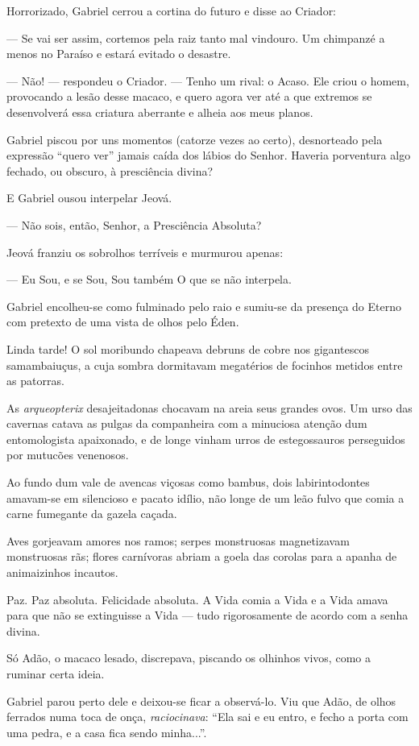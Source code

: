 Horrorizado, Gabriel cerrou a cortina do futuro e disse ao Criador:

--- Se vai ser assim, cortemos pela raiz tanto mal vindouro. Um
chimpanzé a menos no Paraíso e estará evitado o desastre.

--- Não! --- respondeu o Criador. --- Tenho um rival: o Acaso. Ele criou
o homem, provocando a lesão desse macaco, e quero agora ver até a que
extremos se desenvolverá essa criatura aberrante e alheia aos meus
planos.

Gabriel piscou por uns momentos (catorze vezes ao certo), desnorteado
pela expressão ``quero ver'' jamais caída dos lábios do Senhor. Haveria
porventura algo fechado, ou obscuro, à presciência divina?

E Gabriel ousou interpelar Jeová.

--- Não sois, então, Senhor, a Presciência Absoluta?

Jeová franziu os sobrolhos terríveis e murmurou apenas:

--- Eu Sou, e se Sou, Sou também O que se não interpela.

Gabriel encolheu-se como fulminado pelo raio e sumiu-se da presença do
Eterno com pretexto de uma vista de olhos pelo Éden.

Linda tarde! O sol moribundo chapeava debruns de cobre nos gigantescos
samambaiuçus, a cuja sombra dormitavam megatérios de focinhos metidos
entre as patorras.

As \emph{arqueopterix} desajeitadonas chocavam na areia seus grandes
ovos. Um urso das cavernas catava as pulgas da companheira com a
minuciosa atenção dum entomologista apaixonado, e de longe vinham urros
de estegossauros perseguidos por mutucões venenosos.

Ao fundo dum vale de avencas viçosas como bambus, dois labirintodontes
amavam-se em silencioso e pacato idílio, não longe de um leão fulvo que
comia a carne fumegante da gazela caçada.

Aves gorjeavam amores nos ramos; serpes monstruosas magnetizavam
monstruosas rãs; flores carnívoras abriam a goela das corolas para a
apanha de animaizinhos incautos.

Paz. Paz absoluta. Felicidade absoluta. A Vida comia a Vida e a Vida
amava para que não se extinguisse a Vida --- tudo rigorosamente de
acordo com a senha divina.

Só Adão, o macaco lesado, discrepava, piscando os olhinhos vivos, como a
ruminar certa ideia.

Gabriel parou perto dele e deixou-se ficar a observá-lo. Viu que Adão,
de olhos ferrados numa toca de onça, \emph{raciocinava}: ``Ela sai e eu
entro, e fecho a porta com uma pedra, e a casa fica sendo minha...''.

